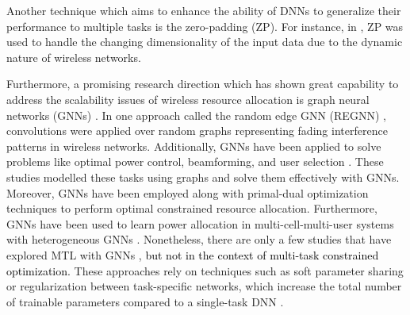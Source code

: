 Another  technique which aims to enhance the ability of DNNs to generalize their performance to multiple tasks is the zero-padding (ZP).
For instance, in \cite{z1, z10, z12}, ZP was used to handle the changing dimensionality of the input data due to the dynamic nature of wireless networks. 

Furthermore, a promising research direction which has shown great capability to address the scalability issues of wireless resource allocation is graph neural networks (GNNs) \cite{gnn5}. In one approach called the random edge GNN (REGNN) \cite{gnn1}, convolutions were applied over random graphs representing fading interference patterns in wireless networks. Additionally, GNNs have been applied to solve problems like optimal power control, beamforming, and user selection \cite{gnn2,gnn3}. These studies modelled these tasks using graphs and solve them effectively with GNNs. Moreover,  
GNNs have been employed along with primal-dual optimization techniques \cite{gnn4} to perform optimal constrained resource allocation. Furthermore, GNNs have been used to learn power allocation in multi-cell-multi-user systems with heterogeneous GNNs \cite{gnn6}.  Nonetheless, there are only a few studies that have explored MTL with GNNs  \cite{mtgn1,mtgn2}, \textcolor{black}{ but not in the context of multi-task constrained optimization.} These approaches rely on techniques such as soft parameter sharing or regularization between task-specific networks, which increase the total number of trainable parameters compared to a single-task DNN \cite{mtgn1,mtgn2}. 

